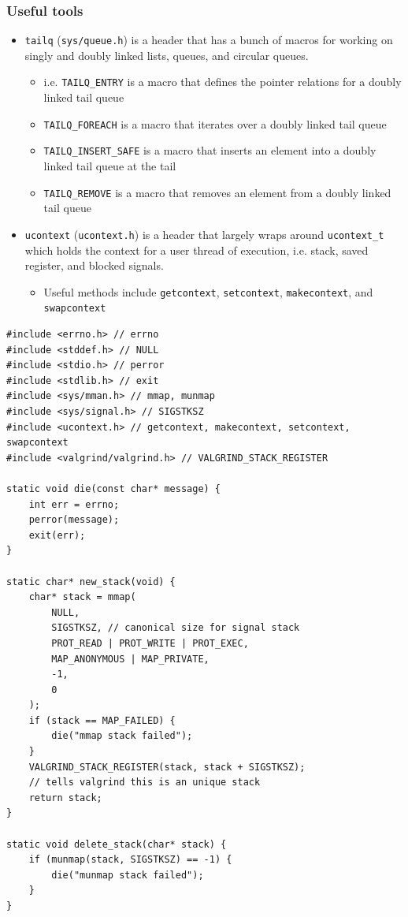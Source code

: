 \documentclass[../notes.tex]{subfiles}
\begin{document}
\subsubsection{Useful tools}

\begin{itemize}
    \item \texttt{tailq} (\texttt{sys/queue.h}) is a header that has a bunch of macros for working on singly and doubly linked lists, queues, and circular queues.
        \begin{itemize}
            \item i.e. \texttt{TAILQ\_ENTRY} is a macro that defines the pointer relations for a doubly linked tail queue
            \item \texttt{TAILQ\_FOREACH} is a macro that iterates over a doubly linked tail queue
            \item \texttt{TAILQ\_INSERT\_SAFE} is a macro that inserts an element into a doubly linked tail queue at the tail
            \item \texttt{TAILQ\_REMOVE} is a macro that removes an element from a doubly linked tail queue
        \end{itemize}
    \item \texttt{ucontext} (\texttt{ucontext.h}) is a header that largely wraps around \texttt{ucontext\_t} which holds the context for a user thread of execution, i.e. stack, saved register, and blocked signals.
    \begin{itemize}
        \item Useful methods include \texttt{getcontext}, \texttt{setcontext}, \texttt{makecontext}, and \texttt{swapcontext}
    \end{itemize}
\end{itemize}


\begin{listing}[H]
\begin{verbatim}
#include <errno.h> // errno
#include <stddef.h> // NULL
#include <stdio.h> // perror
#include <stdlib.h> // exit
#include <sys/mman.h> // mmap, munmap
#include <sys/signal.h> // SIGSTKSZ
#include <ucontext.h> // getcontext, makecontext, setcontext, swapcontext
#include <valgrind/valgrind.h> // VALGRIND_STACK_REGISTER

static void die(const char* message) {
    int err = errno;
    perror(message);
    exit(err);
}

static char* new_stack(void) {
    char* stack = mmap(
        NULL,
        SIGSTKSZ, // canonical size for signal stack
        PROT_READ | PROT_WRITE | PROT_EXEC,
        MAP_ANONYMOUS | MAP_PRIVATE,
        -1,
        0
    );
    if (stack == MAP_FAILED) {
        die("mmap stack failed");
    }
    VALGRIND_STACK_REGISTER(stack, stack + SIGSTKSZ);
    // tells valgrind this is an unique stack
    return stack;
}

static void delete_stack(char* stack) {
    if (munmap(stack, SIGSTKSZ) == -1) {
        die("munmap stack failed");
    }
}
\end{verbatim}
\end{listing}
\end{document}
